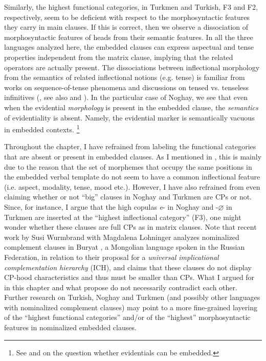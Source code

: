 \documentclass[output=paper]{langsci/langscibook}
\begin{document}
Similarly, the highest functional categories, in Turkmen and Turkish, F3 and F2, respectively, seem to be deficient with respect to the morphosyntactic features they carry in main clauses. 
If this is correct, then we observe a dissociation of morphosyntactic features of heads from their semantic features. 
In all the three languages analyzed here, the embedded clauses can express aspectual and tense properties independent from the matrix clause, implying that the related operators are actually present. 
The dissociations between inflectional morphology from the semantics of related inflectional notions (e.g. tense) is familiar from works on sequence-of-tense phenomena and discussions on tensed vs. tenseless infinitives (\citealp{Stowell1982,Wurmbrand2014}, see also \citealp{Enc1987} and \citealp{Ogihara1996}). 
In the particular case of Noghay, we see that even when the evidential \textit{morphology} is present in the embedded clause, the \textit{semantics} of evidentiality is absent. 
Namely, the evidential marker is semantically vacuous in embedded contexts.%
    \footnote{%
        See \citet{Aikhenvald2004} and \citet{SchennerSauerland2007} on the question whether evidentials can be embedded.
    }

Throughout the chapter, I have refrained from labeling the functional categories that are absent or present in embedded clauses. 
As I mentioned in , this is mainly due to the reason that the set of morphemes that occupy the same positions in the embedded verbal template do not seem to have a common inflectional feature (i.e. aspect, modality, tense, mood etc.). 
However, I have also refrained from even claiming whether or not ``big'' clauses in Noghay and Turkmen are CPs or not. 
Since, for instance, I argue that the high copulas \textit{e}{}- in Noghay and -\textit{$\varnothing$} in Turkmen are inserted at the ``highest inflectional category'' (F3), one might wonder whether these clauses are full CPs as in matrix clauses. 
Note that recent work by Susi Wurmbrand with Magdalena Lohninger \citep{WurmbrandLohninger2019} analyzes nominalized complement clauses in Buryat \citep{Bondarenko2018}, a Mongolian language spoken in the Russian Federation, in relation to their proposal for a \textit{universal implicational complementation hierarchy} (ICH), and claims that these clauses do not display CP-hood characteristics and thus must be smaller than CPs. 
What I argued for in this chapter and what \citet{WurmbrandLohninger2019} propose do not necessarily contradict each other. 
Further research on Turkish, Noghay and Turkmen (and possibly other languages with nominalized complement clauses) may point to a more fine-grained layering of the ``highest functional categories'' and/or of the ``highest'' morphosyntactic features in nominalized embedded clauses.
\end{document}
